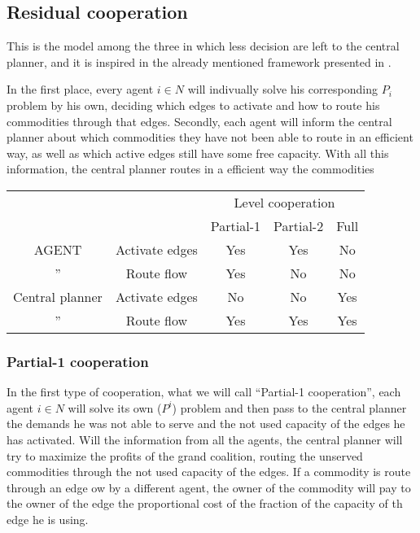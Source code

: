 \documentclass[review]{elsarticle}
\begin{document}
\subsection{Residual cooperation}

This is the model among the three in which less decision are left to the central
planner, and it is inspired in the already mentioned framework presented in
\cite{ANUPINDI2001}. 

In the first place, every agent $i\in N$ will indivually solve his corresponding
$P_i$ problem by his own, deciding which edges to activate and how to route his
commodities through that edges. Secondly, each agent will inform the central
planner about which commodities they have not been able to route in an efficient
way, as well as which active edges still have some free capacity. With all this
information, the central planner routes in a efficient way the commodities

\begin{table}[ht!]
    \begin{tabular}{cc|ccc}
        & &      \multicolumn{3}{|c}{Level cooperation} \\\cline{3-5}
        & & Partial-1 & Partial-2 & Full \\ \hline
        AGENT & Activate edges & Yes & Yes & No \\
        '' & Route flow     & Yes & No & No \\\hline
        Central planner & Activate edges & No & No & Yes \\
        '' & Route flow & Yes & Yes & Yes
        \end{tabular}
    \end {table}

\subsubsection*{Partial-1 cooperation}


In the first type of cooperation, what we will call ``Partial-1 cooperation'',
each agent $i\in N$ will solve its own ($P^i$) problem and then pass to the
central planner the demands he was not able to serve and the not used capacity
of the edges he has activated. Will the information from all the agents, the
central planner will try to maximize the profits of the grand coalition, routing
the unserved commodities through the not used capacity of the edges. If a
commodity is route through an edge ow by a different agent, the owner of the
commodity will pay to the owner of the edge the proportional cost of the
fraction of the capacity of th edge he is using.
\end{document}
